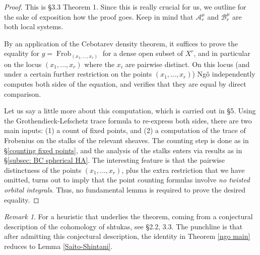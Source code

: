 \documentclass[reqno]{amsart}
\numberwithin{equation}{section}
\newcommand{\Cal}[1]{\mathcal{#1}}
\DeclareMathOperator{\Frob}{Frob}
\theoremstyle{remark}
\newtheorem{remark}[thm]{Remark}
\numberwithin{equation}{section}
\begin{document}
\begin{proof}
This is \cite{Ngo06} \S 3.3 Theorem 1. Since this is really crucial for us, we outline for the sake of exposition how the proof goes. Keep in mind that $\Cal{A}^{\mu}_r$ and $\Cal{B}^{\mu}_r$ are both local systems. 

By an application of the Cebotarev density theorem, it suffices to prove the equality for $g = \Frob_{(x_1, \ldots, x_r)}$ for a dense open subset of $X^r$, and in particular on the locus $(x_1, \ldots, x_r)$ where the $x_i$ are pairwise distinct. On this locus (and under a certain further restriction on the points $(x_1, \ldots, x_r)$) Ng\^{o} independently computes both sides of the equation, and verifies that they are equal by direct comparison. 

Let us say a little more about this computation, which is carried out in \cite{Ngo06} \S 5. Using the Grothendieck-Lefschetz trace formula to re-express both sides, there are two main inputs: (1) a count of fixed points, and (2) a computation of the trace of Frobenius on the stalks of the relevant sheaves. The counting step is done as in \S \ref{counting fixed points}, and the analysis of the stalks enters via results as in \S \ref{subsec: BC spherical HA}. The interesting feature is that the pairwise distinctness of the points $(x_1, \ldots, x_r)$, plus the extra restriction that we have omitted, turns out to imply that the point counting formulas involve \emph{no twisted orbital integrals}. Thus, no fundamental lemma is required to prove the desired equality.



\end{proof}


\begin{remark}For a heuristic that underlies the theorem, coming from a conjectural description of the cohomology of shtukas, see \cite{Ngo06} \S 2.2, 3.3. The punchline is that after admitting this conjectural description, the identity in Theorem \ref{ngo main} reduces to Lemma \ref{Saito-Shintani}.
\end{remark}
\end{document}
